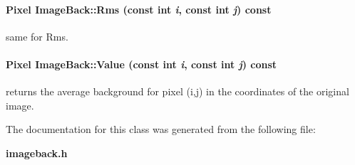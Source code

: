 \paragraph{\setlength{\rightskip}{0pt plus 5cm}Pixel Image\-Back::Rms (const int {\em i}, const int {\em j}) const}\hfill\label{class_imageback_a5}


same for Rms. 
\paragraph{\setlength{\rightskip}{0pt plus 5cm}Pixel Image\-Back::Value (const int {\em i}, const int {\em j}) const}\hfill\label{class_imageback_a4}


returns the average background for pixel (i,j) in the coordinates of the original image. 

The documentation for this class was generated from the following file:\begin{CompactItemize}
\item 
{\bf imageback.h}\end{CompactItemize}
